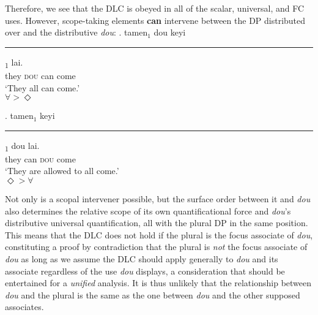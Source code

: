 \documentclass[12pt]{article}
\let\latextextsubscript\textsubscript
\let\textsubscript\latextextsubscript
\newcommand{\gap}[1]{\rule{1em}{0.4pt}\textsubscript{#1}}
\begin{document}
%   
%   
Therefore, we see that the DLC is obeyed in all of the scalar, universal, and FC uses.
However, scope-taking elements \textbf{can} intervene between the DP distributed over and the distributive \emph{dou}:
\ex. \gll
tamen\(_1\) dou  keyi  \gap{1}  lai. \\
they \textsc{dou} can {} come \\
\glt `They all can come.'\\
\(\forall > \Diamond\)

\ex. \gll
tamen\(_1\)  keyi  \gap{1} dou  lai. \\
they can {} \textsc{dou} come \\
\glt `They are allowed to all come.'\\
\(\Diamond > \forall\)

Not only is a scopal intervener possible, but the surface order between it and \emph{dou} also determines the relative scope of its own quantificational force and \emph{dou}'s distributive universal quantification, all with the plural DP in the same position.
This means that the DLC does not hold if the plural is the focus associate of \emph{dou}, constituting a proof by contradiction that the plural is \emph{not} the focus associate of \emph{dou} as long as we assume the DLC should apply generally to \emph{dou} and its associate regardless of the use \emph{dou} displays, a consideration that should be entertained for a \emph{unified} analysis.
It is thus unlikely that the relationship between \emph{dou} and the plural is the same as the one between \emph{dou} and the other supposed associates.


%
\end{document}

